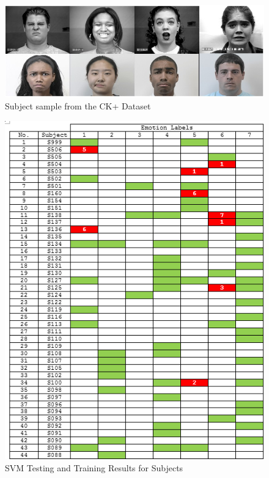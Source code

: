 \begin{figure}[H]
  \centering
  \includegraphics[scale=0.6]{faces}
  \caption{Subject sample from the CK+ Dataset \cite{ck}}
  \label{fig:faces}
\end{figure} 

\begin{figure}[H]
  \centering
  \includegraphics[scale=1.5]{res1}
  \caption{SVM Testing and Training Results for Subjects}
  \label{fig: res1}
\end{figure} 
